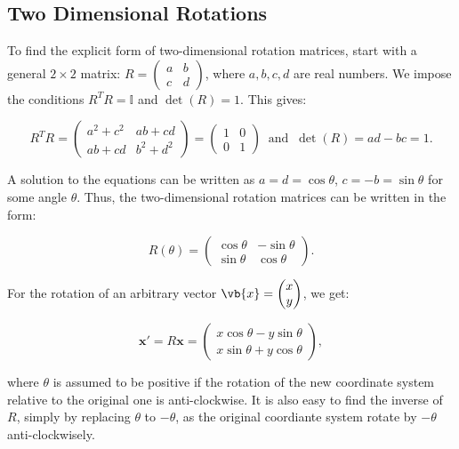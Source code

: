 \documentclass[a4paper,12pt]{report}
\begin{document}
\subsection{Two Dimensional Rotations}

To find the explicit form of two-dimensional rotation matrices, start with a general \(2 \times 2\) matrix: \(R = \begin{pmatrix} a & b \\ c & d \end{pmatrix}\), where \(a, b, c, d\) are real numbers. We impose the conditions \(R^T R = \mathbb{I}\) and \(\det(R) = 1\). This gives:

\begin{equation}
R^T R = \begin{pmatrix} a^2 + c^2 & ab + cd \\ ab + cd & b^2 + d^2 \end{pmatrix} = \begin{pmatrix} 1 & 0 \\ 0 & 1 \end{pmatrix} ~\text { and }~  
\det(R) = ad - bc = 1.
\end{equation}

A solution to the equations can be written as \(a = d = \cos\theta\), \(c = -b = \sin\theta\) for some angle \(\theta\). Thus, the two-dimensional rotation matrices can be written in the form:

\begin{equation}
R(\theta) = \begin{pmatrix} \cos \theta & -\sin \theta \\ \sin \theta & \cos \theta \end{pmatrix}.
\end{equation}

For the rotation of an arbitrary vector \(\vb{x} = \begin{pmatrix}
     x \\
     y \\
\end{pmatrix}\), we get:

\begin{equation}
\mathbf{x}' = R\mathbf{x} = \begin{pmatrix} x \cos \theta - y \sin \theta \\ x \sin \theta + y \cos \theta \end{pmatrix},
\end{equation}

where \(\theta \) is assumed to be positive if the rotation of the new coordinate system relative to the original one is anti-clockwise. It is also easy to find the inverse of \(R\), simply by replacing \(\theta \) to \(- \theta \), as the original coordiante system rotate by \(- \theta \) anti-clockwisely.     
\end{document}
